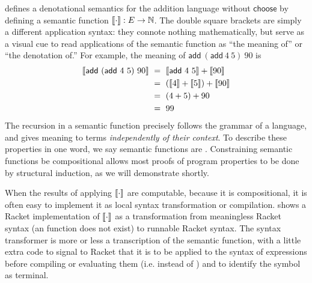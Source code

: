  defines a denotational semantics for the addition language without $\mathsf{choose}$ by defining a semantic function $\left\llbracket{\cdot}\right\rrbracket : E \to \mathbb{N}$.
The double square brackets are simply a different application syntax: they connote nothing mathematically, but serve as a visual cue to read applications of the semantic function as ``the meaning of'' or ``the denotation of.''
For example, the meaning of $\mathsf{add}~(\mathsf{add}~4~5)~90$ is
\begin{equation}
\begin{aligned}
	\left\llbracket{\mathsf{add}~(\mathsf{add}~4~5)~90}\right\rrbracket
	&\ =\ \left\llbracket{\mathsf{add}~4~5}\right\rrbracket + \left\llbracket{90}\right\rrbracket
\\
	&\ =\ (\left\llbracket{4}\right\rrbracket + \left\llbracket{5}\right\rrbracket) + \left\llbracket{90}\right\rrbracket
\\
	&\ =\ (4 + 5) + 90
\\
	&\ =\ 99
\end{aligned}
\end{equation}
The recursion in a semantic function precisely follows the grammar of a language, and gives meaning to terms \emph{independently of their context}.
To describe these properties in one word, we say semantic functions are .
Constraining semantic functions be compositional allows most proofs of program properties to be done by structural induction, as we will demonstrate shortly.

When the results of applying $\left\llbracket{\cdot}\right\rrbracket$ are computable, because it is compositional, it is often easy to implement it as local syntax transformation or compilation.
 shows a Racket implementation of $\left\llbracket{\cdot}\right\rrbracket$ as a transformation from meaningless Racket syntax (an  function does not exist) to runnable Racket syntax.
The syntax transformer is more or less a transcription of the semantic function, with a little extra code to signal to Racket that it is to be applied to the syntax of expressions before compiling or evaluating them (i.e.  instead of ) and to identify the symbol  as terminal.

